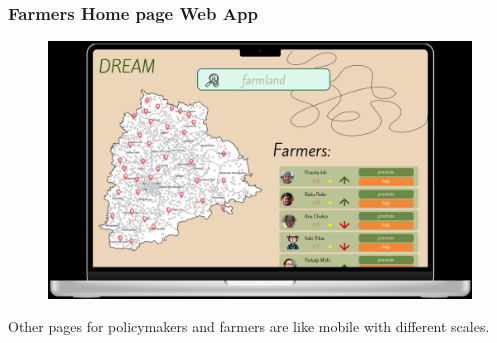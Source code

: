 \subsubsection{Farmers Home page Web App}
    \begin{figure}[ht]
        \centering
        \includegraphics[width = 0.95\linewidth]{figures/policymakerweb.png}
        \label{fig:profile}
    \end{figure}
Other pages for policymakers and farmers are like mobile with different scales.
\clearpage

